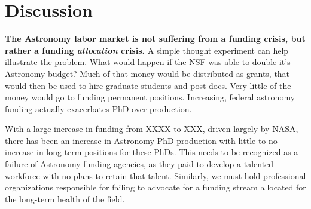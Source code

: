 \documentclass[preprint2]{aastex}
\begin{document}







\section{Discussion}

{\bf{The Astronomy labor market is not suffering from a funding crisis, but rather a funding {\emph{allocation}} crisis.}} A simple thought experiment can help illustrate the problem. What would happen if the NSF was able to double it's Astronomy budget? Much of that money would be distributed as grants, that would then be used to hire graduate students and post docs. Very little of the money would go to funding permanent positions. Increasing, federal astronomy funding actually exacerbates PhD over-production. 

With a large increase in funding from XXXX to XXX, driven largely by NASA, there has been an increase in Astronomy PhD production with little to no increase in long-term positions for these PhDs.  This needs to be recognized as a failure of Astronomy funding agencies, as they paid to develop a talented workforce with no plans to retain that talent. Similarly, we must hold professional organizations responsible for failing to advocate for a funding stream allocated for the long-term health of the field.  
\end{document}
